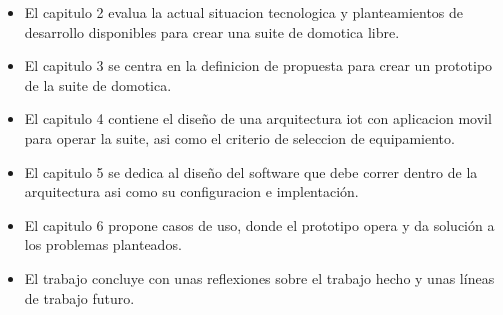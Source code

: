 \begin{itemize}
  \item El capitulo 2 evalua la actual situacion tecnologica y planteamientos de desarrollo disponibles para crear una suite de domotica libre.

  \item El capitulo 3 se centra en la definicion de propuesta para crear un prototipo de la suite de domotica.

  \item El capitulo 4 contiene el diseño de una arquitectura \gls{iot} con aplicacion movil para operar la suite, asi como el criterio de seleccion de equipamiento.

  \item El capitulo 5 se dedica al diseño del software que debe correr dentro de la arquitectura asi como su configuracion e implentación.

  \item El capitulo 6 propone casos de uso, donde el prototipo opera y da solución a los problemas planteados.

  \item El trabajo concluye con unas reflexiones sobre el trabajo hecho y unas líneas de trabajo futuro.
\end{itemize}

